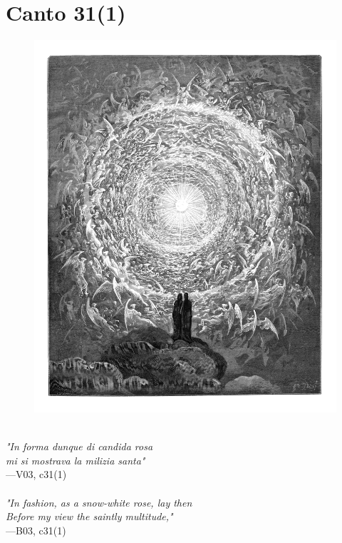\documentclass[../Dore_vision.tex]{subfiles}
\begin{document}
\newpage

\section{Canto 31(1)}

\begin{figure}[ht]
\centering
\includegraphics[height=\figsize]{illustrations/book_3/V03, c31(1).jpg}
\end{figure}

\begin{center}
\begin{minipage}{0.8\linewidth}
\textit{\\
"In forma dunque di candida rosa\\mi si mostrava la milizia santa"} \\
—V03, c31(1) \\~\\
\textit{"In fashion, as a snow-white rose, lay then\\Before my view the saintly multitude,"} \\
—B03, c31(1)
\end{minipage}
\end{center}
\end{document}

